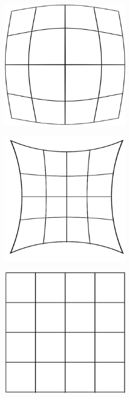 \begin{figure}[!ht]
	\begin{subfigure}[c]{0.3\textwidth}
		\centering
		\includegraphics[width=0.6\textwidth]{img/camera/distortion-barrel.png}
		\caption{}
		\label{fig:barrel-distortion}
	\end{subfigure}
	\begin{subfigure}[c]{0.3\textwidth}
		\centering
		\includegraphics[width=0.6\textwidth]{img/camera/distortion-pincushion.png}
		\caption{}
		\label{fig:pincushion-distortion}
	\end{subfigure}
	\centering
	\begin{subfigure}[c]{0.3\textwidth}
		\centering
		\includegraphics[width=0.6\textwidth]{img/camera/no-distortion.png}
		\caption{}
		\label{fig:no-distortion-lens}
	\end{subfigure}


\end{figure}
